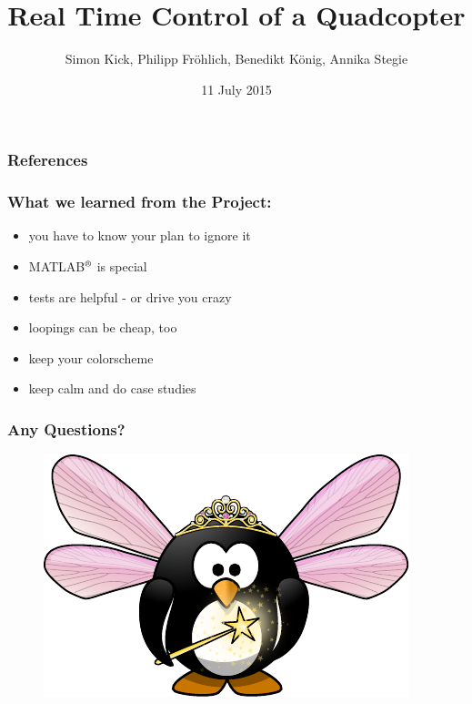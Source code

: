 \documentclass[12pt]{beamer} %
\title{Real Time Control of a Quadcopter}
\author{Simon Kick, Philipp Fr\"ohlich, Benedikt K\"onig, Annika Stegie}
\institute{Technische Universit\"at M\"unchen}
\date{11 July 2015}
\begin{document}
\begin{frame}
\maketitle
\thispagestyle{empty}
\end{frame}













\nocite{Boyd2009}
\nocite{Diehl2001}
\nocite{Diehl2002}
\nocite{Diehl2005}
\nocite{Diebel2006}
\nocite{Garcia2013}
\nocite{Richter-Gebert2009}
\nocite{Reyes-Valeria2013}
\nocite{Hartmann2014}
%
\begin{frame}[allowframebreaks] %
 \frametitle{References}
	
	
\end{frame}

\begin{frame}
	\frametitle{What we learned from the Project:}
	\begin{doublespace}
	\begin{itemize}
		\item you have to know your plan to ignore it
		\item MATLAB\(^{\text{\textregistered}}\) is special
		\item tests are helpful - or drive you crazy
		\item loopings can be cheap, too
		\item keep your colorscheme
		\item keep calm and do case studies
	\end{itemize}
	\end{doublespace}
\end{frame}

\begin{frame}
\frametitle{Any Questions?}
	\begin{figure}%
	\includegraphics[width=0.9\columnwidth]{images/Easter_Egg/fairy-penguin}%
	\end{figure}
\end{frame}
\end{document}
